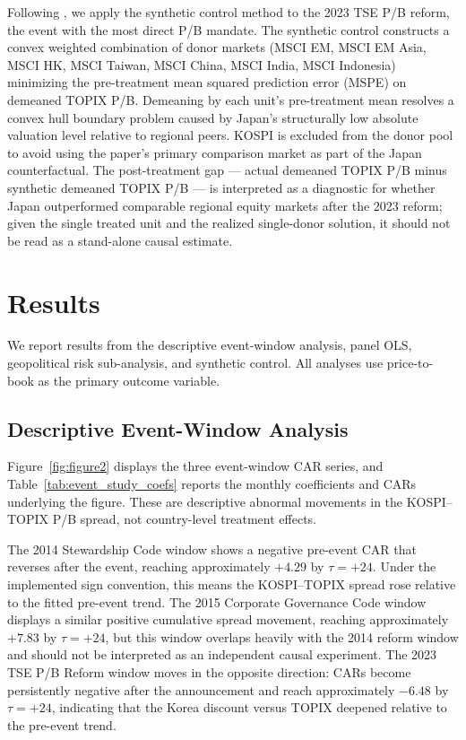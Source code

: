 \documentclass[12pt]{article}
\begin{document}
Following \citet{abadie2010}, we apply the synthetic control method to the 2023 TSE P/B
reform, the event with the most direct P/B mandate. The synthetic control constructs a convex
weighted combination of donor markets (MSCI EM, MSCI EM Asia, MSCI HK, MSCI Taiwan, MSCI
China, MSCI India, MSCI Indonesia) minimizing the pre-treatment mean squared prediction error
(MSPE) on demeaned TOPIX P/B. Demeaning by each unit's pre-treatment mean resolves a convex
hull boundary problem caused by Japan's structurally low absolute valuation level relative to
regional peers. KOSPI is excluded from the donor pool to avoid using the paper's primary
comparison market as part of the Japan counterfactual. The post-treatment gap --- actual
demeaned TOPIX P/B minus synthetic demeaned TOPIX P/B --- is interpreted as a diagnostic for
whether Japan outperformed comparable regional equity markets after the 2023 reform; given
the single treated unit and the realized single-donor solution, it should not be read as a
stand-alone causal estimate.

\section{Results}
\label{sec:results}

We report results from the descriptive event-window analysis, panel OLS, geopolitical risk
sub-analysis, and synthetic control. All analyses use price-to-book as the primary outcome
variable.

\subsection{Descriptive Event-Window Analysis}

Figure~\ref{fig:figure2} displays the three event-window CAR series, and
Table~\ref{tab:event_study_coefs} reports the monthly coefficients and CARs underlying the
figure. These are descriptive abnormal movements in the KOSPI--TOPIX P/B spread, not
country-level treatment effects.

The 2014 Stewardship Code window shows a negative pre-event CAR that reverses after the event,
reaching approximately $+4.29$ by $\tau=+24$. Under the implemented sign convention, this
means the KOSPI--TOPIX spread rose relative to the fitted pre-event trend. The 2015 Corporate
Governance Code window displays a similar positive cumulative spread movement, reaching
approximately $+7.83$ by $\tau=+24$, but this window overlaps heavily with the 2014 reform
window and should not be interpreted as an independent causal experiment. The 2023 TSE P/B
Reform window moves in the opposite direction: CARs become persistently negative after the
announcement and reach approximately $-6.48$ by $\tau=+24$, indicating that the Korea discount
versus TOPIX deepened relative to the pre-event trend.
\end{document}
